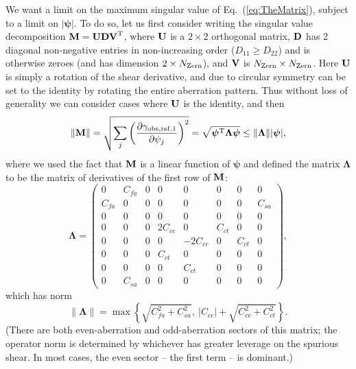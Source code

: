 \documentclass[aps,prd, amsmath,amssymb,superscriptaddress,showkeys,nofootinbib,reprint,preprintnumbers]{revtex4-1}
\begin{document}
We want a limit on the maximum singular value of
Eq.~(\ref{eq:TheMatrix}), subject to a limit on
$|{\boldsymbol\psi}|$. To do so, let us first consider writing the
singular value decomposition ${\bf M} = {\bf UDV}^{\rm T}$, where
${\bf U}$ is a $2\times 2$ orthogonal matrix, ${\bf D}$ has 2 diagonal
non-negative entries in non-increasing order ($D_{11}\ge D_{22}$) and
is otherwise zeroes (and has dimension $2\times N_{\rm Zern}$), and
${\bf V}$ is $N_{\rm Zern}\times N_{\rm Zern}$. Here ${\bf U}$ is
simply a rotation of the shear derivative, and due to circular
symmetry can be set to the identity by rotating the entire aberration
pattern. Thus without loss of generality we can consider cases where
${\bf U}$ is the identity, and then
\begin{equation}
\lVert{\bf M} \rVert = \sqrt{ \sum_j \left(\frac{\partial \gamma_{{\rm obs,ref},1}}{\partial\psi_j} \right)^2 }
= \sqrt{ {\boldsymbol\psi}^{\rm T} {\boldsymbol\Lambda}{\boldsymbol\psi} }
\le \lVert{\boldsymbol\Lambda} \rVert |{\boldsymbol\psi}|,
\end{equation}
where we used the fact that ${\bf M}$ is a linear function of ${\boldsymbol\psi}$ and defined the matrix ${\boldsymbol\Lambda}$ to be the matrix of derivatives of the first row of ${\bf M}$:
\begin{equation}
{\boldsymbol\Lambda} = \left( \begin{array}{cccccccc}
0 & C_{fa} & 0 & 0 & 0 & 0 & 0 & 0 \\
C_{fa} & 0 & 0 & 0 & 0 & 0 & 0 & C_{sa} \\
0 & 0 & 0 & 0 & 0 & 0 & 0 & 0 \\
0 & 0 & 0 & 2C_{cc} & 0 & C_{ct} & 0 & 0 \\
0 & 0 & 0 & 0 & -2C_{cc} & 0 & C_{ct} & 0 \\
0 & 0 & 0 & C_{ct} & 0 & 0 & 0 & 0 \\
0 & 0 & 0 & 0 & C_{ct} & 0 & 0 & 0 \\
0 & C_{sa} & 0 & 0 & 0 & 0 & 0 & 0
\end{array} \right),
\end{equation}
which has norm
\begin{equation}
\lVert {\boldsymbol\Lambda} \rVert = \max \left\{
\sqrt{C_{fa}^2 + C_{sa}^2}, ~|C_{cc}|+\sqrt{C_{cc}^2+C_{ct}^2}
\right\}.
\label{eq:LambdaNorm}
\end{equation}
(There are both even-aberration and odd-aberration sectors of this
matrix; the operator norm is determined by whichever has greater
leverage on the spurious shear. In most cases, the even sector -- the
first term -- is dominant.)
\end{document}
